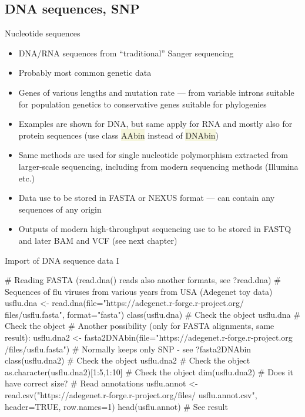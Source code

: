 \documentclass[compress, xelatex, 11pt, xcolor=svgnames, aspectratio=169,
	hyperref={
		bookmarks=true,
		unicode=true,
		colorlinks=true,
		pdftitle={Molecular data in R},
		plainpages=false,
		pdfauthor={Vojtech Zeisek},
		pdfsubject={Course about phylogeny and evolution in R},
		pdfcreator={XeLaTeX},
		pdfkeywords={R, evolution, phylogeny, molecular data},
		linkcolor=Crimson, %
		anchorcolor=Magenta, %
		citecolor=Magenta, %
		filecolor=Magenta, %
		menucolor=Magenta, %
		urlcolor=DodgerBlue, %
		},
	url={hyphens, lowtilde} %
	]{beamer}
\renewcommand{\texttt}[1]{\colorbox{Beige}{{\ttfamily #1}}}
\begin{document}
\subsection{DNA sequences, SNP}

\begin{frame}{Nucleotide sequences}
	\begin{itemize}
		\item DNA/RNA sequences from \enquote{traditional} Sanger sequencing
		\item Probably most common genetic data
		\item Genes of various lengths and mutation rate --- from variable introns suitable for population genetics to conservative genes suitable for phylogenies
		\item Examples are shown for DNA, but same apply for RNA and mostly also for protein sequences (use class \texttt{AAbin} instead of \texttt{DNAbin})
		\item Same methods are used for single nucleotide polymorphism extracted from larger-scale sequencing, including from modern sequencing methods (Illumina etc.)
		\item Data use to be stored in FASTA  or NEXUS format --- can contain any sequences of any origin
		\item Outputs of modern high-throughput sequencing use to be stored in FASTQ and later BAM and VCF (see next chapter)
	\end{itemize}
\end{frame}

\begin{frame}[fragile]{Import of DNA sequence data I}
	\begin{spluscode}
    # Reading FASTA (read.dna() reads also another formats, see ?read.dna)
    # Sequences of flu viruses from various years from USA (Adegenet toy data)
    usflu.dna <- read.dna(file="https://adegenet.r-forge.r-project.org/
      files/usflu.fasta", format="fasta")
    class(usflu.dna) # Check the object
    usflu.dna # Check the object
    # Another possibility (only for FASTA alignments, same result):
    usflu.dna2 <- fasta2DNAbin(file="https://adegenet.r-forge.r-project.org
      /files/usflu.fasta") # Normally keeps only SNP - see ?fasta2DNAbin
    class(usflu.dna2) # Check the object
    usflu.dna2 # Check the object
    as.character(usflu.dna2)[1:5,1:10] # Check the object
    dim(usflu.dna2) # Does it have correct size?
    # Read annotations
    usflu.annot <- read.csv("https://adegenet.r-forge.r-project.org/files/
      usflu.annot.csv", header=TRUE, row.names=1)
    head(usflu.annot) # See result
	\end{spluscode}
\end{frame}
\end{document}
